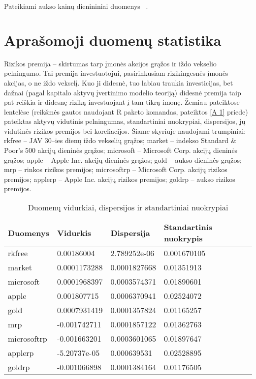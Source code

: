 \documentclass[12pt, a14paper, lithuanian]{article}
\begin{document}
Pateikiami aukso kainų dienininiai duomenys~\cite{gold} .

\newpage
\section{Aprašomoji duomenų statistika}

Rizikos premija -- skirtumas tarp įmonės akcijos grąžos ir iždo vekselio pelningumo. Tai premija investuotojui,
pasirinkusiam rizikingesnės įmonės akcijas, o ne iždo vekselį. Kuo ji didesnė, tuo labiau
traukia investicijas, bet dažnai (pagal kapitalo aktyvų įvertinimo modelio teoriją) didesnė premija taip pat reiškia ir didesnę riziką 
investuojant į tam tikrą imonę. Žemiau pateiktose lentelėse (reikšmės gautos naudojant R paketo komandas, pateiktos \ref{A 1} priede) pateiktas aktyvų vidutinis pelningumas,
standartiniai nuokrypiai, dispersijos, jų vidutinės rizikos premijos bei koreliacijos. Šiame skyriuje naudojami trumpiniai:
rkfree -- JAV 30--ies dienų iždo vekselių grąžos;
market -- indekso Standard \& Poor's 500 akcijų dieninės grąžos;
microsoft -- Microsoft Corp. akcijų dieninės grąžos;
apple -- Apple Inc. akcijų dieninės grąžos;
gold -- aukso dieninės grąžos;
mrp -- rinkos rizikos premijos;
microsoftrp -- Microsoft Corp. akcijų rizikos premijos;
applerp -- Apple Inc. akcijų rizikos premijos;
goldrp -- aukso rizikos premijos. 


\begin{table}[ht]
\begin{center}
    \begin{tabular}{ | l | l | l | l |}
    \hline
    Duomenys & Vidurkis & Dispersija & Standartinis nuokrypis \\
    \hline
    rkfree & 0.00186004 & 2.789252e-06 & 0.001670105 \\
    market & 0.0001173288 & 0.0001827668 & 0.01351913 \\
    microsoft & 0.0001968397 & 0.0003574371 & 0.01890601 \\
    apple & 0.001807715 & 0.0006370941 & 0.02524072 \\  
    gold & 0.0007931419 & 0.0001357824 & 0.01165257 \\
    mrp & -0.001742711 & 0.0001857122 & 0.01362763 \\
    microsoftrp & -0.001663201 & 0.0003601065 & 0.01897647 \\
    applerp & -5.20737e-05 & 0.000639531 & 0.02528895 \\
    goldrp & -0.001066898 & 0.0001384164 & 0.01176505 \\
    \hline
    \end{tabular}
\end{center}
\caption{Duomenų vidurkiai, dispersijos ir standartiniai nuokrypiai}
\end{table}
\end{document}
